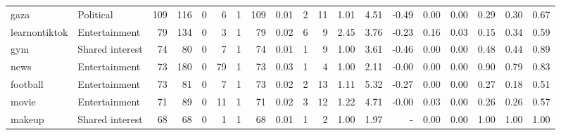 \begin{tabular}{llrrrrrrrrrrrrrrrrr}
            gaza &       Political &    109 &    116 &                           0 &                            6 &             1 &                        109 &     0.01 &    2 &     11 & 1.01 &   4.51 &                              -0.49 &   0.00 &         0.00 &                                0.29 &                                   0.30 &                                     0.67 \\
   learnontiktok &   Entertainment &     79 &    134 &                           0 &                            3 &             1 &                         79 &     0.02 &    6 &      9 & 2.45 &   3.76 &                              -0.23 &   0.16 &         0.03 &                                0.15 &                                   0.34 &                                     0.59 \\
             gym & Shared interest &     74 &     80 &                           0 &                            7 &             1 &                         74 &     0.01 &    1 &      9 & 1.00 &   3.61 &                              -0.46 &   0.00 &         0.00 &                                0.48 &                                   0.44 &                                     0.89 \\
            news &   Entertainment &     73 &    180 &                           0 &                           79 &             1 &                         73 &     0.03 &    1 &      4 & 1.00 &   2.11 &                              -0.00 &   0.00 &         0.00 &                                0.90 &                                   0.79 &                                     0.83 \\
        football &   Entertainment &     73 &     81 &                           0 &                            7 &             1 &                         73 &     0.02 &    2 &     13 & 1.11 &   5.32 &                              -0.27 &   0.00 &         0.00 &                                0.27 &                                   0.18 &                                     0.51 \\
           movie &   Entertainment &     71 &     89 &                           0 &                           11 &             1 &                         71 &     0.02 &    3 &     12 & 1.22 &   4.71 &                              -0.00 &   0.03 &         0.00 &                                0.26 &                                   0.26 &                                     0.57 \\
          makeup & Shared interest &     68 &     68 &                           0 &                            1 &             1 &                         68 &     0.01 &    1 &      2 & 1.00 &   1.97 &                                - &   0.00 &         0.00 &                                1.00 &                                   1.00 &                                     1.00 \\

\end{tabular}
